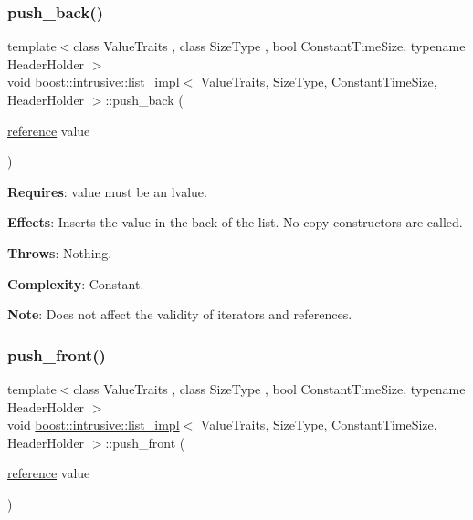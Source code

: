 \subsubsection{\texorpdfstring{push\+\_\+back()}{push\_back()}}
{\footnotesize\ttfamily template$<$class Value\+Traits , class Size\+Type , bool Constant\+Time\+Size, typename Header\+Holder $>$ \\
void \hyperlink{classboost_1_1intrusive_1_1list__impl}{boost\+::intrusive\+::list\+\_\+impl}$<$ Value\+Traits, Size\+Type, Constant\+Time\+Size, Header\+Holder $>$\+::push\+\_\+back (\begin{DoxyParamCaption}\item[{\hyperlink{classboost_1_1intrusive_1_1list__impl_a881763b587dbe7c0237a552a9e89755a}{reference}}]{value }\end{DoxyParamCaption})\hspace{0.3cm}{\ttfamily [inline]}}

{\bfseries Requires}\+: value must be an lvalue.

{\bfseries Effects}\+: Inserts the value in the back of the list. No copy constructors are called.

{\bfseries Throws}\+: Nothing.

{\bfseries Complexity}\+: Constant.

{\bfseries Note}\+: Does not affect the validity of iterators and references. \mbox{\label{classboost_1_1intrusive_1_1list__impl_ae11db4262630360dd6080aebdbd01ce8}} 
\subsubsection{\texorpdfstring{push\+\_\+front()}{push\_front()}}
{\footnotesize\ttfamily template$<$class Value\+Traits , class Size\+Type , bool Constant\+Time\+Size, typename Header\+Holder $>$ \\
void \hyperlink{classboost_1_1intrusive_1_1list__impl}{boost\+::intrusive\+::list\+\_\+impl}$<$ Value\+Traits, Size\+Type, Constant\+Time\+Size, Header\+Holder $>$\+::push\+\_\+front (\begin{DoxyParamCaption}\item[{\hyperlink{classboost_1_1intrusive_1_1list__impl_a881763b587dbe7c0237a552a9e89755a}{reference}}]{value }\end{DoxyParamCaption})\hspace{0.3cm}{\ttfamily [inline]}}


